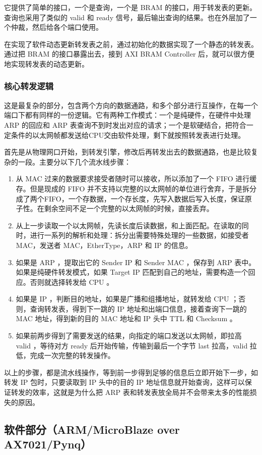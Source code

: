 \documentclass{ctexart}
\begin{document}
  它提供了简单的接口，一个是查询，一个是 BRAM 的接口，用于转发表的更新。查询也采用了类似的 valid 和 ready 信号，最后输出查询的结果。也在外层加了一个仲裁，然后给各个端口使用。

  在实现了软件动态更新转发表之前，通过初始化的数据实现了一个静态的转发表。通过把 BRAM 的接口暴露出去，接到 AXI BRAM Controller 后，就可以很方便地实现转发表的动态更新。

\subsubsection{核心转发逻辑}
  这是最复杂的部分，包含两个方向的数据通路，和多个部分进行互操作，在每一个端口下都有同样的一份逻辑。它有两种工作模式：一个是纯硬件，在硬件中处理 ARP 的回应和 ARP 表查询不到时发出对应的请求；一个是软硬结合，把符合一定条件的以太网帧都发送给CPU交由软件处理，剩下就按照转发表进行处理。

  首先是从物理网口开始，到转发引擎，修改后再转发出去的数据通路，也是比较复杂的一段。主要分以下几个流水线步骤：

  \begin{enumerate}
    \item 从 MAC 过来的数据要求接受者随时可以接收，所以添加了一个 FIFO 进行缓存。但是现成的 FIFO 并不支持以完整的以太网帧的单位进行舍弃，于是拆分成了两个FIFO，一个存数据，一个存长度，先写入数据后写入长度，保证原子性。在剩余空间不足一个完整的以太网帧的时候，直接丢弃。
    \item 从上一步读取一个以太网帧，先读长度后读数据，和上面匹配。在读取的同时，进行一系列的解析和处理：拆分出需要特殊处理的一些数据，如接受者 MAC，发送者 MAC，EtherType，ARP 和 IP 的信息。
    \item 如果是 ARP ，提取出它的 Sender IP 和 Sender MAC ，保存到 ARP 表中。如果是纯硬件转发模式，如果 Target IP 匹配到自己的地址，需要构造一个回应。否则就选择转发给 CPU 。
    \item 如果是 IP ，判断目的地址，如果是广播和组播地址，就转发给 CPU ；否则，查询转发表，得到下一跳的 IP 地址和出端口信息，接着查询下一跳的 MAC 地址，得到新的目的 MAC 地址和 IP 头中 TTL 和 Checksum 。
    \item 如果前两步得到了需要发送的结果，向指定的端口发送以太网帧，即拉高 valid ，等待对方 ready 后开始传输，传输到最后一个字节 last 拉高，valid 拉低，完成一次完整的转发操作。
  \end{enumerate}

  以上的步骤，都是流水线操作，等到前一步得到足够的信息后立即开始下一步，如转发 IP 包时，只要读取到 IP 头中的目的 IP 地址信息就开始查询，这样可以保证转发的效率，这就是为什么把 ARP 表和转发表放全局并不会带来太多的性能损失的原因。

\subsection{软件部分（ARM/MicroBlaze over AX7021/Pynq）}
\end{document}
